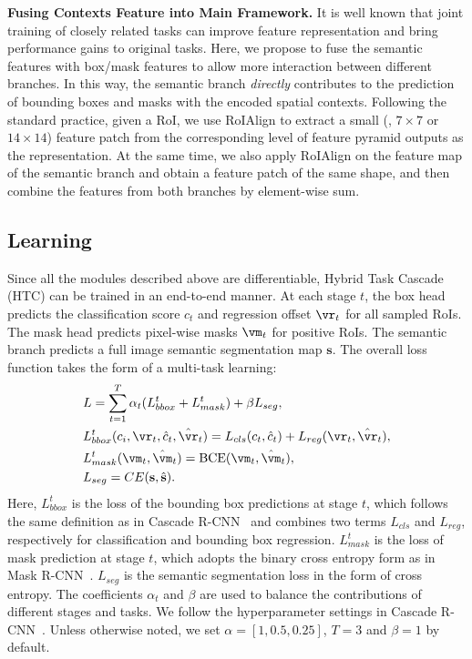 \documentclass[10pt,twocolumn,letterpaper]{article}
\begin{document}
\vspace{0.1cm}
\noindent
\textbf{Fusing Contexts Feature into Main Framework.}
It is well known that joint training of closely related tasks can improve
feature representation and bring performance gains to original tasks.
Here, we propose to fuse the semantic features with box/mask features to allow
more interaction between different branches. In this way, the semantic branch
\emph{directly} contributes to the prediction of bounding boxes and masks
with the encoded spatial contexts.
Following the standard practice, given a RoI, we use RoIAlign to extract
a small (\eg, $7\times7$ or $14\times 14$) feature patch from the corresponding
level of feature pyramid outputs as the representation. At the same time, we
also apply RoIAlign on the feature map of the semantic branch and obtain
a feature patch of the same shape, and then combine the features from both
branches by element-wise sum.

\subsection{Learning}
\label{subsec:training}

Since all the modules described above are differentiable, Hybrid Task Cascade
(HTC) can be trained in an end-to-end manner. At each stage $t$, the box head
predicts the classification score $c_t$ and regression offset $\vr_t$ for all
sampled RoIs. The mask head predicts pixel-wise masks $\vm_t$ for positive RoIs.
The semantic branch predicts a full image semantic segmentation map $\mathbf{s}$.
The overall loss function takes the form of a multi-task learning:
\begin{equation}
	\label{equ:loss}
	\begin{split}
		&L = \sum_{t=1}^T \alpha_t (L_{bbox}^t + L_{mask}^t) + \beta L_{seg}, \\
		&L_{bbox}^t(c_i, \vr_t, \hat{c}_t, \hat{\vr}_t) = L_{cls}(c_t, \hat{c}_t) + L_{reg}(\vr_t, \hat{\vr}_t), \\
		&L_{mask}^t(\vm_t, \hat{\vm}_t) = \text{BCE}(\vm_t, \hat{\vm}_t), \\
		&L_{seg} = CE(\mathbf{s}, \hat{\mathbf{s}}).
	\end{split}
\end{equation}
Here,
$L_{bbox}^t$ is the loss of the bounding box predictions at stage $t$, which
follows the same definition as in Cascade R-CNN~\cite{cai18cascadercnn} and combines two
terms $L_{cls}$ and $L_{reg}$, respectively for classification and bounding
box regression.
$L_{mask}^t$ is the loss of mask prediction at stage $t$,
which adopts the binary cross entropy form as in Mask R-CNN~\cite{he2017mask}.
$L_{seg}$ is the semantic segmentation loss in the form of cross entropy.
The coefficients $\alpha_t$ and $\beta$ are used to balance the contributions
of different stages and tasks.
We follow the hyperparameter settings in Cascade R-CNN~\cite{cai18cascadercnn}.
Unless otherwise noted, we set $\alpha = [1, 0.5, 0.25]$, $T=3$ and
$\beta = 1$ by default.
 
\end{document}
